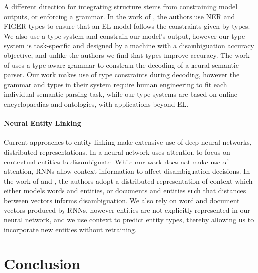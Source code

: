 \documentclass[letterpaper]{article}
\begin{document}
A different direction for integrating structure stems from constraining model outputs, or enforcing a grammar. In the work of \cite{ling2015design}, the authors use NER and FIGER types to ensure that an EL model follows the constraints given by types. We also use a type system and constrain our model's output, however our type system is task-specific and designed by a machine with a disambiguation accuracy objective, and unlike the authors we find that types improve accuracy. The work of \cite{jayant2017parsing} uses a type-aware grammar to constrain the decoding of a neural semantic parser. Our work makes use of type constraints during decoding, however the grammar and types in their system require human engineering to fit each individual semantic parsing task, while our type systems are based on online encyclopaedias and ontologies, with applications beyond EL.

\paragraph{Neural Entity Linking} Current approaches to entity linking make extensive use of deep neural networks, distributed representations. In \cite{globerson2016collective} a neural network uses attention to focus on contextual entities to disambiguate. While our work does not make use of attention, RNNs allow context information to affect disambiguation decisions. In the work of \cite{yamada2016joint} and \cite{yamada2017learning}, the authors adopt a distributed representation of context which either models words and entities, or documents and entities such that distances between vectors informs disambiguation. We also rely on word and document vectors produced by RNNs, however entities are not explicitly represented in our neural network, and we use context to predict entity types, thereby allowing us to incorporate new entities without retraining.
\section{Conclusion}
\end{document}
